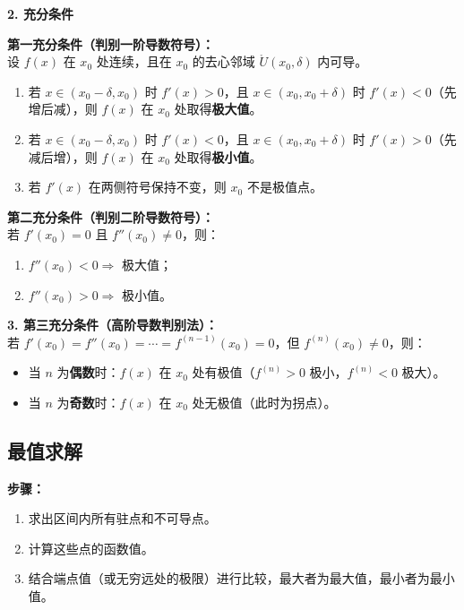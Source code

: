 \documentclass[a4paper,12pt]{ctexart}
\newenvironment{purplebox}
  {\begin{tcolorbox}[colback=white, colframe=boxpurple, boxrule=1pt, sharp corners, title=\textbf{定义/定理/核心公式}]}
  {\end{tcolorbox}}
\begin{document}
\textbf{2. 充分条件}

\begin{purplebox}
\textbf{第一充分条件（判别一阶导数符号）：} \\
设 $f(x)$ 在 $x_0$ 处连续，且在 $x_0$ 的去心邻域 $\mathring{U}(x_0, \delta)$ 内可导。
\begin{enumerate}
    \item 若 $x \in (x_0-\delta, x_0)$ 时 $f'(x) > 0$，且 $x \in (x_0, x_0+\delta)$ 时 $f'(x) < 0$（先增后减），则 $f(x)$ 在 $x_0$ 处取得\textbf{极大值}。
    \item 若 $x \in (x_0-\delta, x_0)$ 时 $f'(x) < 0$，且 $x \in (x_0, x_0+\delta)$ 时 $f'(x) > 0$（先减后增），则 $f(x)$ 在 $x_0$ 处取得\textbf{极小值}。
    \item 若 $f'(x)$ 在两侧符号保持不变，则 $x_0$ 不是极值点。
\end{enumerate}
\end{purplebox}

\begin{purplebox}
\textbf{第二充分条件（判别二阶导数符号）：} \\
若 $f'(x_0) = 0$ 且 $f''(x_0) \neq 0$，则：
\begin{enumerate}
    \item $f''(x_0) < 0 \Rightarrow$ 极大值；
    \item $f''(x_0) > 0 \Rightarrow$ 极小值。
\end{enumerate}
\end{purplebox}

\textbf{3. 第三充分条件（高阶导数判别法）：} \\
若 $f'(x_0) = f''(x_0) = \cdots = f^{(n-1)}(x_0) = 0$，但 $f^{(n)}(x_0) \neq 0$，则：
\begin{itemize}
    \item 当 $n$ 为\textbf{偶数}时：$f(x)$ 在 $x_0$ 处有极值（$f^{(n)} > 0$ 极小，$f^{(n)} < 0$ 极大）。
    \item 当 $n$ 为\textbf{奇数}时：$f(x)$ 在 $x_0$ 处无极值（此时为拐点）。
\end{itemize}

\subsection{最值求解}
\textbf{步骤：}
\begin{enumerate}
    \item 求出区间内所有驻点和不可导点。
    \item 计算这些点的函数值。
    \item 结合端点值（或无穷远处的极限）进行比较，最大者为最大值，最小者为最小值。
\end{enumerate}
\end{document}
